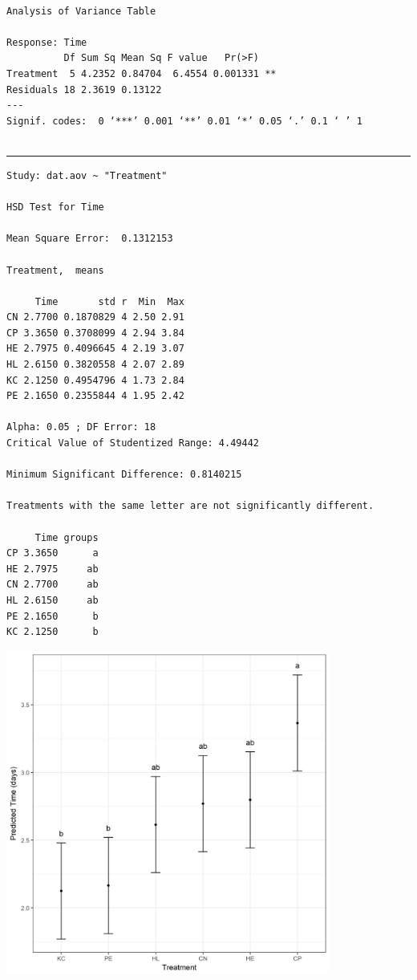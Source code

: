 \documentclass[a4paper, 10pt, fleqn, twosided]{memoir}
\begin{document}
\begin{tcolorbox}[title = Exercise 2 output continued]
\begin{verbatim}

Analysis of Variance Table

Response: Time
          Df Sum Sq Mean Sq F value   Pr(>F)
Treatment  5 4.2352 0.84704  6.4554 0.001331 **
Residuals 18 2.3619 0.13122
---
Signif. codes:  0 ‘***’ 0.001 ‘**’ 0.01 ‘*’ 0.05 ‘.’ 0.1 ‘ ’ 1


\end{verbatim}
{\color{outpt} {\hrule height 1pt}}
\begin{verbatim}
Study: dat.aov ~ "Treatment"

HSD Test for Time

Mean Square Error:  0.1312153

Treatment,  means

     Time       std r  Min  Max
CN 2.7700 0.1870829 4 2.50 2.91
CP 3.3650 0.3708099 4 2.94 3.84
HE 2.7975 0.4096645 4 2.19 3.07
HL 2.6150 0.3820558 4 2.07 2.89
KC 2.1250 0.4954796 4 1.73 2.84
PE 2.1650 0.2355844 4 1.95 2.42

Alpha: 0.05 ; DF Error: 18
Critical Value of Studentized Range: 4.49442

Minimum Significant Difference: 0.8140215

Treatments with the same letter are not significantly different.

     Time groups
CP 3.3650      a
HE 2.7975     ab
CN 2.7700     ab
HL 2.6150     ab
PE 2.1650      b
KC 2.1250      b

\end{verbatim}
\end{tcolorbox}

\begin{tcolorbox}[title = Exercise 2 output continued]
\includegraphics[width=0.8\textwidth, frame]{Exercise2Pred.png}

\end{tcolorbox}
\end{document}

